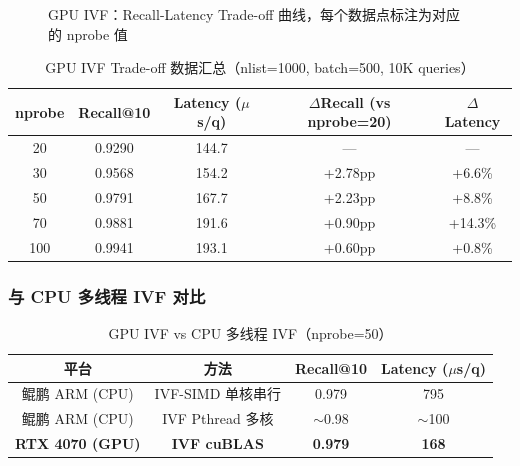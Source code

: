 \documentclass[UTF8,a4paper,10pt]{ctexart}
\begin{document}
\begin{figure}[H]
\centering
{}
\caption{GPU IVF：Recall-Latency Trade-off 曲线，每个数据点标注为对应的 nprobe 值}
\label{fig:ivf-tradeoff}
\end{figure}

\begin{table}[H]
\centering
\caption{GPU IVF Trade-off 数据汇总（nlist=1000, batch=500, 10K queries）}
\label{tab:ivf-tradeoff-detail}
\begin{tabular}{ccccc}
\toprule
nprobe & Recall@10 & Latency ($\mu$s/q) & $\Delta$Recall (vs nprobe=20) & $\Delta$Latency \\
\midrule
20  & 0.9290 & 144.7 & — & — \\
30  & 0.9568 & 154.2 & +2.78pp & +6.6\% \\
50  & 0.9791 & 167.7 & +2.23pp & +8.8\% \\
70  & 0.9881 & 191.6 & +0.90pp & +14.3\% \\
100 & 0.9941 & 193.1 & +0.60pp & +0.8\% \\
\bottomrule
\end{tabular}
\end{table}

\subsubsection{与 CPU 多线程 IVF 对比}

\begin{table}[H]
\centering
\caption{GPU IVF vs CPU 多线程 IVF（nprobe=50）}
\label{tab:ivf-vs-cpu}
\begin{tabular}{cccc}
\toprule
平台 & 方法 & Recall@10 & Latency ($\mu$s/q) \\
\midrule
鲲鹏 ARM (CPU) & IVF-SIMD 单核串行 & 0.979 & 795 \\
鲲鹏 ARM (CPU) & IVF Pthread 多核 & $\sim$0.98 & $\sim$100 \\
\textbf{RTX 4070 (GPU)} & \textbf{IVF cuBLAS} & \textbf{0.979} & \textbf{168} \\
\bottomrule
\end{tabular}
\end{table}
\end{document}
